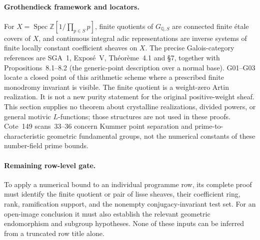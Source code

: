 \paragraph{Grothendieck framework and locators.}
For $X=\operatorname{Spec}\mathbb Z[1/\prod_{p\in S}p]$, finite quotients of $G_{\mathbb Q,S}$ are connected finite \'etale covers of $X$, and continuous integral adic representations are inverse systems of finite locally constant coefficient sheaves on $X$. The precise Galois-category references are SGA~1, Expos\'e~V, Th\'eor\`eme~4.1 and \S7, together with Propositions~8.1--8.2 (the generic-point description over a normal base). G01--G03 locate a closed point of this arithmetic scheme where a prescribed finite monodromy invariant is visible.  The finite quotient is a weight-zero Artin realization.  It is not a new purity statement for the original positive-weight sheaf.  This section supplies no theorem about crystalline realizations, divided powers, or general motivic $L$-functions; those structures are not used in these proofs.  Cote~149 scans~33--36 concern Kummer point separation and prime-to-characteristic geometric fundamental groups, not the numerical constants of these number-field prime bounds.

\paragraph{Remaining row-level gate.}
To apply a numerical bound to an individual programme row, its complete proof must identify the finite quotient or pair of lisse sheaves, their coefficient ring, rank, ramification support, and the nonempty conjugacy-invariant test set. For an open-image conclusion it must also establish the relevant geometric endomorphism and subgroup hypotheses. None of these inputs can be inferred from a truncated row title alone.
